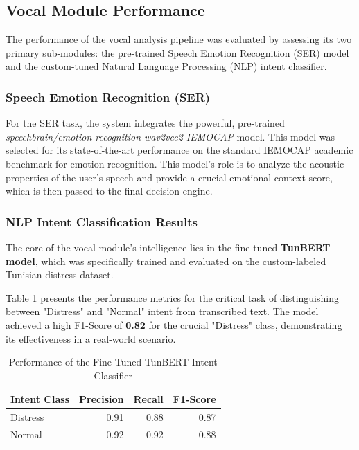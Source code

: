 \documentclass[12pt,a4paper,oneside,english]{book}
\begin{document}
{    \subsection{Vocal Module Performance}
\label{subsec:vocal_results}

The performance of the vocal analysis pipeline was evaluated by assessing its two primary sub-modules: the pre-trained Speech Emotion Recognition (SER) model and the custom-tuned Natural Language Processing (NLP) intent classifier.

\subsubsection{Speech Emotion Recognition (SER)}
For the SER task, the system integrates the powerful, pre-trained \textit{speechbrain/emotion-recognition-wav2vec2-IEMOCAP} model. 
This model was selected for its state-of-the-art performance on the standard IEMOCAP academic benchmark for emotion recognition. 
This model's role is to analyze the acoustic properties of the user's speech and provide a crucial emotional context score, which is then passed to the final decision engine.

\subsubsection{NLP Intent Classification Results}
The core of the vocal module's intelligence lies in the fine-tuned \textbf{TunBERT model}, which was specifically trained and evaluated on the custom-labeled Tunisian distress dataset. 

Table \ref{tab:nlp_results} presents the performance metrics for the critical task of distinguishing between "Distress" and "Normal" intent from transcribed text. The model achieved a high F1-Score of \textbf{0.82} for the crucial "Distress" class, demonstrating its effectiveness in a real-world scenario.

\begin{table}[h!]
    \centering
    \caption{Performance of the Fine-Tuned TunBERT Intent Classifier}
    \label{tab:nlp_results}
    \begin{tabular}{lrrr}
        \hline
        \textbf{Intent Class} & \textbf{Precision} & \textbf{Recall} & \textbf{F1-Score} \\ \hline
        Distress              & 0.91               & 0.88            & 0.87              \\
        Normal                & 0.92               & 0.92            & 0.88              \\ \hline
    \end{tabular}
\end{table}

}
\end{document}

